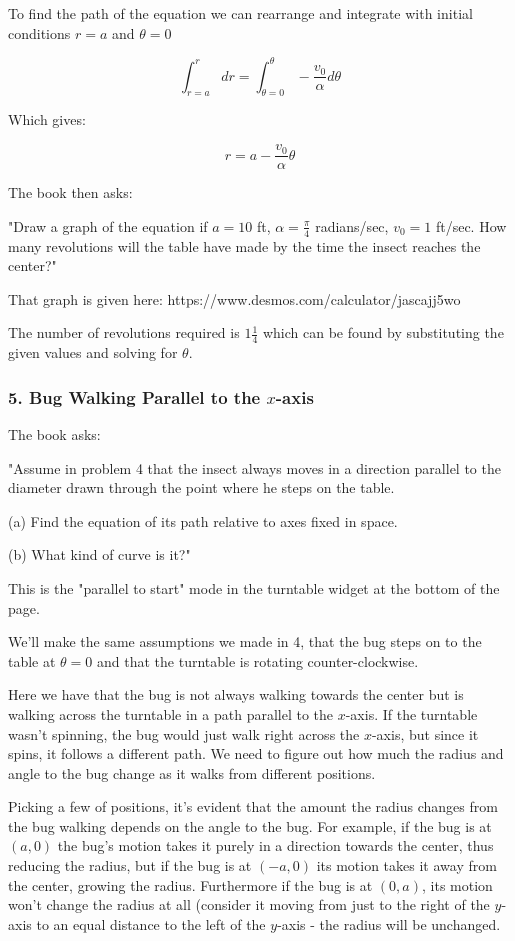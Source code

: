 \documentclass{article}
\begin{document}
To find the path of the equation we can rearrange and integrate with initial conditions $r = a$ and $\theta = 0$

\[ \int_{r=a}^{r} dr = \int_{\theta=0}^{\theta}-\frac{v_0}{\alpha}d\theta \tag{e} \]

Which gives:

\[ r = a - \frac{v_0}{\alpha}\theta \tag{f} \]

The book then asks:

"Draw a graph of the equation if $a = 10$ ft, $\alpha = \frac{\pi}{4}$ radians/sec, $v_0 = 1$ ft/sec. How many revolutions will the table have made by the time the insect reaches the center?"

That graph is given here: https://www.desmos.com/calculator/jascajj5wo

The number of revolutions required is $1\frac{1}{4}$ which can be found by substituting the given values and solving for $\theta$.

\subsubsection{5. Bug Walking Parallel to the $x$-axis}

The book asks:

"Assume in problem 4 that the insect always moves in a direction parallel to the diameter drawn through the point where he steps on the table.

(a) Find the equation of its path relative to axes fixed in space.

(b) What kind of curve is it?"

This is the "parallel to start" mode in the turntable widget at the bottom of the page.

We'll make the same assumptions we made in 4, that the bug steps on to the table at $\theta = 0$ and that the turntable is rotating counter-clockwise.

Here we have that the bug is not always walking towards the center but is walking across the turntable in a path parallel to the $x$-axis. If the turntable wasn't spinning, the bug would just walk right across the $x$-axis, but since it spins, it follows a different path. We need to figure out how much the radius and angle to the bug change as it walks from different positions.

Picking a few of positions, it's evident that the amount the radius changes from the bug walking depends on the angle to the bug. For example, if the bug is at $(a, 0)$ the bug's motion takes it purely in a direction towards the center, thus reducing the radius, but if the bug is at $(-a, 0)$ its motion takes it away from the center, growing the radius. Furthermore if the bug is at $(0, a)$, its motion won't change the radius at all (consider it moving from just to the right of the $y$-axis to an equal distance to the left of the $y$-axis - the radius will be unchanged.
\end{document}
